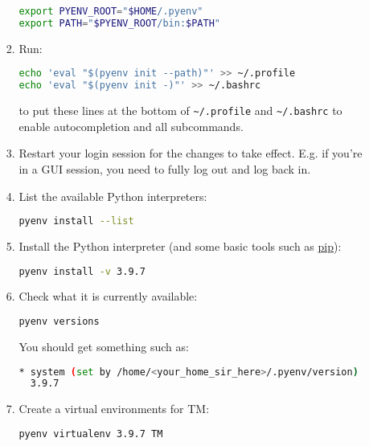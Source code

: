 \begin{enumerate}
\begin{enumerate}
\begin{enumerate}
        \begin{lstlisting}[mathescape=false, language=Bash]
export PYENV_ROOT="$HOME/.pyenv"
export PATH="$PYENV_ROOT/bin:$PATH"
        \end{lstlisting}

      \item Run:
        \begin{lstlisting}[mathescape=false, language=Bash]
echo 'eval "$(pyenv init --path)"' >> ~/.profile
echo 'eval "$(pyenv init -)"' >> ~/.bashrc
        \end{lstlisting}
        to put these lines at the bottom of \verb|~/.profile| and \verb|~/.bashrc| to enable autocompletion and all subcommands.

      \item Restart your login session for the changes to take
        effect. E.g. if you're in a GUI session, you need to fully log
        out and log back in.

      \item List the available Python interpreters:
        \begin{lstlisting}[mathescape=false, language=Bash]
pyenv install --list
        \end{lstlisting}

      \item Install the Python interpreter (and some basic tools such as \href{https://pypi.org/project/pip/}{pip}):
        \begin{lstlisting}[mathescape=false, language=Bash]
pyenv install -v 3.9.7
        \end{lstlisting}

      \item Check what it is currently available:
        \begin{lstlisting}[mathescape=false, language=Bash]
pyenv versions        
        \end{lstlisting}
        You should get something such as:
        \begin{lstlisting}[mathescape=false, language=Bash]
* system (set by /home/<your_home_sir_here>/.pyenv/version)
  3.9.7
        \end{lstlisting}

        \item Create a virtual environments for TM:
        \begin{lstlisting}[mathescape=false, language=Bash]
pyenv virtualenv 3.9.7 TM
        \end{lstlisting}


\end{enumerate}
\end{enumerate}
\end{enumerate}

